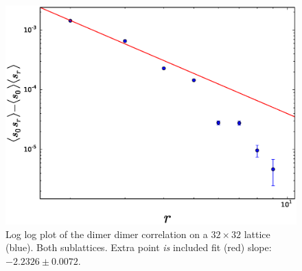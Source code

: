 \documentclass[aps,floatfix,11pt]{revtex4-1}
\begin{document}
\begin{figure}[h]
    \centering
    \includegraphics[width=8.5 cm]{s_dimer_dimer_cor_loglog_both_sublat_32x32_extra_pnt}
    \caption{Log log plot of the dimer dimer correlation on a $32\times32$ lattice (blue). 
        Both sublattices. Extra point \textit{is} included fit (red) slope: $-2.2326 \pm 0.0072$.
    \label{fig:s_dimer_dimer_cor_loglog_both_sublat_32x32_extra_pnt}}
\end{figure}
\end{document}
